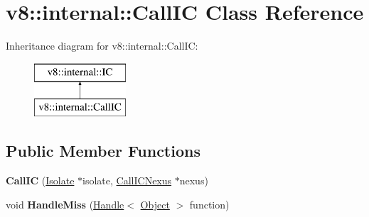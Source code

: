 \hypertarget{classv8_1_1internal_1_1_call_i_c}{}\section{v8\+:\+:internal\+:\+:Call\+IC Class Reference}
\label{classv8_1_1internal_1_1_call_i_c}
Inheritance diagram for v8\+:\+:internal\+:\+:Call\+IC\+:\begin{figure}[H]
\begin{center}
\leavevmode
\includegraphics[height=2.000000cm]{classv8_1_1internal_1_1_call_i_c}
\end{center}
\end{figure}
\subsection*{Public Member Functions}
\begin{DoxyCompactItemize}
\item 
{\bfseries Call\+IC} (\hyperlink{classv8_1_1internal_1_1_isolate}{Isolate} $\ast$isolate, \hyperlink{classv8_1_1internal_1_1_call_i_c_nexus}{Call\+I\+C\+Nexus} $\ast$nexus)\hypertarget{classv8_1_1internal_1_1_call_i_c_ab21747197072c94e8168b1c2598000c3}{}\label{classv8_1_1internal_1_1_call_i_c_ab21747197072c94e8168b1c2598000c3}

\item 
void {\bfseries Handle\+Miss} (\hyperlink{classv8_1_1internal_1_1_handle}{Handle}$<$ \hyperlink{classv8_1_1internal_1_1_object}{Object} $>$ function)\hypertarget{classv8_1_1internal_1_1_call_i_c_a420af5b7053b5fbb2aba7fbf691fb97e}{}\label{classv8_1_1internal_1_1_call_i_c_a420af5b7053b5fbb2aba7fbf691fb97e}

\end{DoxyCompactItemize}

